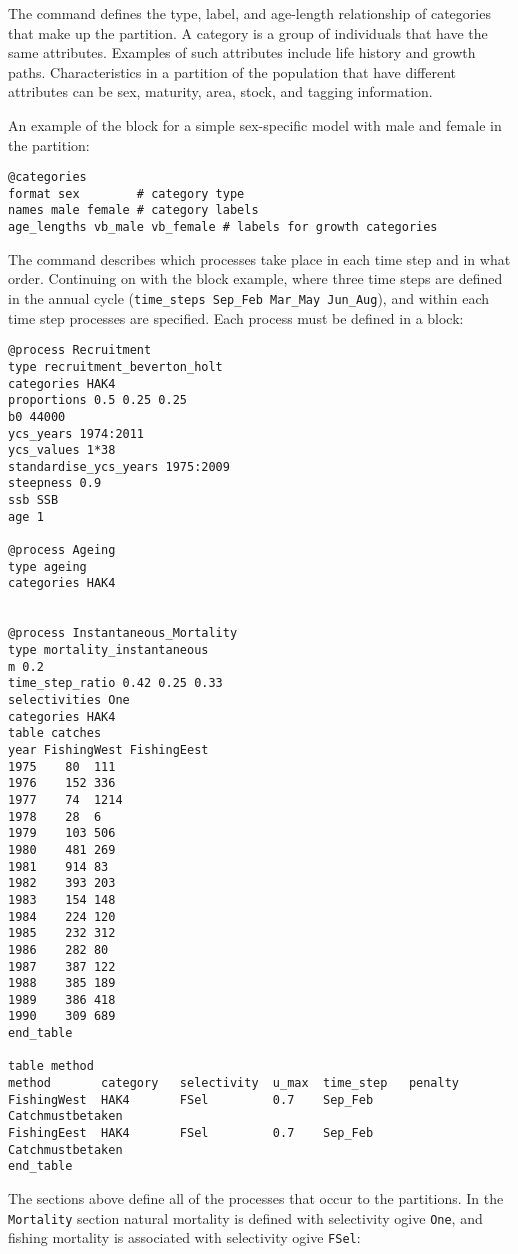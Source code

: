 The  command defines the type, label, and age-length relationship of categories that make up the partition. A category is a group of individuals that have the same attributes. Examples of such attributes include life history and growth paths. Characteristics in a partition of the population that have different attributes can be sex, maturity, area, stock, and tagging information.

An example of the  block for a simple sex-specific model with male and female in the partition:

{\small{\begin{verbatim}
@categories
format sex        # category type
names male female # category labels
age_lengths vb_male vb_female # labels for growth categories
		\end{verbatim}}}

The  command describes which processes take place in each time step and in what order. Continuing on with the  block example, where three time steps are defined in the annual cycle (\texttt{time\_steps Sep\_Feb Mar\_May Jun\_Aug}), and within each time step processes are specified. Each process must be defined in a  block:

{\small{\begin{verbatim}
@process Recruitment
type recruitment_beverton_holt
categories HAK4
proportions 0.5 0.25 0.25
b0 44000
ycs_years 1974:2011
ycs_values 1*38
standardise_ycs_years 1975:2009
steepness 0.9
ssb SSB
age 1

@process Ageing
type ageing
categories HAK4

		
@process Instantaneous_Mortality
type mortality_instantaneous
m 0.2
time_step_ratio 0.42 0.25 0.33
selectivities One
categories HAK4
table catches
year FishingWest FishingEest
1975	80	111
1976	152	336
1977	74	1214
1978	28	6
1979	103	506
1980	481	269
1981	914	83
1982	393	203
1983	154	148
1984	224	120
1985	232	312
1986	282	80
1987	387	122
1988	385	189
1989	386	418
1990	309	689
end_table
		
table method
method  	 category 	selectivity  u_max 	time_step 	penalty
FishingWest  HAK4   	FSel 		 0.7 	Sep_Feb 	Catchmustbetaken
FishingEest  HAK4   	FSel 		 0.7 	Sep_Feb 	Catchmustbetaken
end_table
\end{verbatim}}}

The sections above define all of the processes that occur to the partitions. In the \texttt{Mortality} section natural mortality is defined with selectivity ogive \texttt{One}, and fishing mortality is associated with selectivity ogive \texttt{FSel}:

